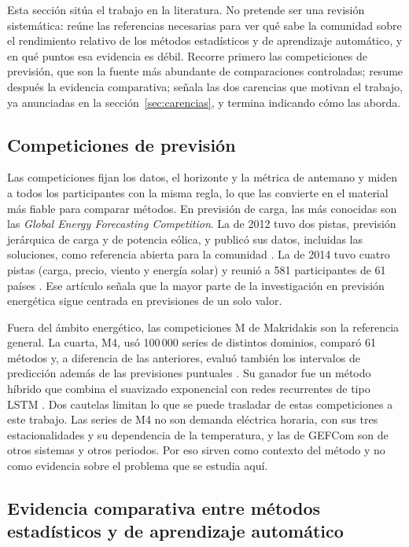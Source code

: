 Esta sección sitúa el trabajo en la literatura. No pretende ser una revisión
sistemática: reúne las referencias necesarias para ver qué sabe la comunidad
sobre el rendimiento relativo de los métodos estadísticos y de aprendizaje
automático, y en qué puntos esa evidencia es débil. Recorre primero las
competiciones de previsión, que son la fuente más abundante de comparaciones
controladas; resume después la evidencia comparativa; señala las dos
carencias que motivan el trabajo, ya anunciadas en la
sección~\ref{sec:carencias}, y termina indicando cómo las aborda.

\subsection{Competiciones de previsión}\label{sec:competiciones}

Las competiciones fijan los datos, el horizonte y la métrica de antemano y
miden a todos los participantes con la misma regla, lo que las convierte en el
material más fiable para comparar métodos. En previsión de carga, las más
conocidas son las \textit{Global Energy Forecasting Competition}. La de 2012
tuvo dos pistas, previsión jerárquica de carga y de potencia eólica, y publicó
sus datos, incluidas las soluciones, como referencia abierta para la comunidad
\parencite{hong2014gefcom2012}. La de 2014 tuvo cuatro pistas (carga, precio,
viento y energía solar) y reunió a 581 participantes de 61 países
\parencite{hong2016gefcom2014}. Ese artículo señala que la mayor parte de la
investigación en previsión energética sigue centrada en previsiones de un solo
valor.

Fuera del ámbito energético, las competiciones M de Makridakis son la
referencia general. La cuarta, M4, usó 100\,000 series de distintos dominios,
comparó 61 métodos y, a diferencia de las anteriores, evaluó también los
intervalos de predicción además de las previsiones puntuales
\parencite{makridakis2020m4}. Su ganador fue un método híbrido que combina el
suavizado exponencial con redes recurrentes de tipo LSTM
\parencite{smyl2020hybrid}. Dos cautelas limitan lo que se puede trasladar de
estas competiciones a este trabajo. Las series de M4 no son demanda eléctrica
horaria, con sus tres estacionalidades y su dependencia de la temperatura, y
las de GEFCom son de otros sistemas y otros periodos. Por eso sirven como
contexto del método y no como evidencia sobre el problema que se estudia aquí.

\subsection{Evidencia comparativa entre métodos estadísticos y de aprendizaje automático}\label{sec:evidencia}

